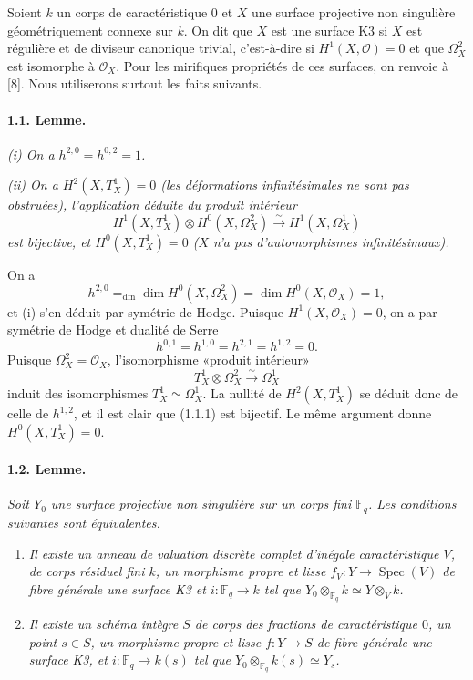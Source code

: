 \documentclass[10pt]{article}
\newcommand{\Fp}{\mathbb{F}_q}
\newcommand{\Spec}{\operatorname{Spec}}
\newcommand{\dfn}{\mathrm{dfn}}
\newcommand{\iso}{\xrightarrow{\sim}}
\begin{document}
Soient $k$ un corps de caractéristique $0$ et $X$ une surface projective non singulière géométriquement connexe sur $k$. On dit que $X$ est une surface K3 si $X$ est régulière et de diviseur canonique trivial, c'est-à-dire si $H^1(X,\mathcal O)=0$ et que $\Omega_X^2$ est isomorphe à $\mathcal O_X$. Pour les mirifiques propriétés de ces surfaces, on renvoie à [8]. Nous utiliserons surtout les faits suivants.

\paragraph{1.1. Lemme.} \emph{(i) On a $h^{2,0}=h^{0,2}=1$.}

\emph{(ii) On a $H^2(X,T_X^1)=0$ (les déformations infinitésimales ne sont pas obstruées), l'application déduite du produit intérieur
\[
\tag{1.1.1}
H^1(X,T_X^1)\otimes H^0(X,\Omega_X^2)\iso H^1(X,\Omega_X^1)
\]
est bijective, et $H^0(X,T_X^1)=0$ ($X$ n'a pas d'automorphismes infinitésimaux).}

On a
\[
h^{2,0}=_{\dfn}\dim H^0(X,\Omega_X^2)=\dim H^0(X,\mathcal O_X)=1,
\]
et (i) s'en déduit par symétrie de Hodge. Puisque $H^1(X,\mathcal O_X)=0$, on a par symétrie de Hodge et dualité de Serre
\[
h^{0,1}=h^{1,0}=h^{2,1}=h^{1,2}=0.
\]
Puisque $\Omega_X^2=\mathcal O_X$, l'isomorphisme «produit intérieur»
\[
T_X^1\otimes \Omega_X^2\iso\Omega_X^1
\]
induit des isomorphismes $T_X^1\simeq\Omega_X^1$. La nullité de $H^2(X,T_X^1)$ se déduit donc de celle de $h^{1,2}$, et il est clair que (1.1.1) est bijectif. Le même argument donne $H^0(X,T_X^1)=0$.

\paragraph{1.2. Lemme.} \emph{Soit $Y_0$ une surface projective non singulière sur un corps fini $\Fp$. Les conditions suivantes sont équivalentes.}
\begin{enumerate}[label=(\roman*)]
\item \emph{Il existe un anneau de valuation discrète complet d'inégale caractéristique $V$, de corps résiduel fini $k$, un morphisme propre et lisse $f_V:Y\to\Spec(V)$ de fibre générale une surface K3 et $i:\Fp\to k$ tel que $Y_0\otimes_{\Fp}k\simeq Y\otimes_V k$.}
\item \emph{Il existe un schéma intègre $S$ de corps des fractions de caractéristique $0$, un point $s\in S$, un morphisme propre et lisse $f:Y\to S$ de fibre générale une surface K3, et $i:\Fp\to k(s)$ tel que $Y_0\otimes_{\Fp}k(s)\simeq Y_s$.}
\end{enumerate}
\end{document}
